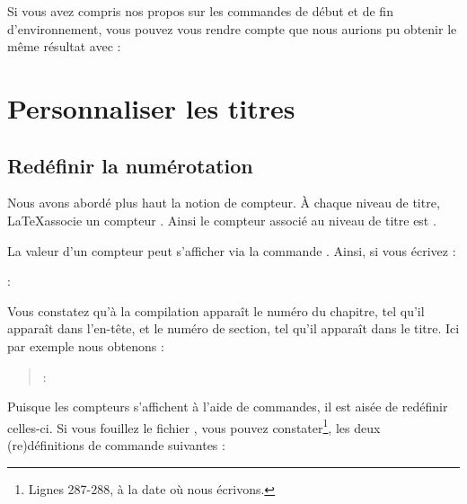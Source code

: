 \begin{plusloins}
Si vous avez compris nos propos sur les commandes de début et de fin d'environnement, vous pouvez vous rendre compte que nous aurions pu obtenir le même résultat avec :

\begin{latexcode}
\let\endoldquotation\endquotation
\renewcommand{\quotation}{\oldquotation\singlespace}
\end{latexcode}

\end{plusloins}

\section{Personnaliser les titres}

\subsection{Redéfinir la numérotation}\label{apparencecompteur}
Nous avons abordé plus haut la notion de compteur. À chaque niveau de titre, \LaTeX associe un compteur . Ainsi le compteur associé au niveau de titre  est .

La valeur d'un compteur peut s'afficher via la commande . Ainsi, si vous écrivez :

\begin{latexcode}
\thechapter : \thesection
\end{latexcode}

Vous constatez qu'à la compilation apparaît le numéro du chapitre, tel qu'il apparaît dans l'en-tête, et le numéro de section, tel qu'il apparaît dans le titre. Ici par exemple nous obtenons :


\begin{quotation}
\thechapter : \thesection
\end{quotation}


Puisque les compteurs s'affichent à l'aide de commandes, il est aisée de redéfinir celles-ci. Si vous fouillez le fichier , vous pouvez constater\footnote{Lignes 287-288, à la date où nous écrivons.}, les deux (re)définitions de commande suivantes :

\begin{latexcode}
\renewcommand \thechapter {\@arabic\c@chapter}
\renewcommand \thesection {\thechapter.\@arabic\c@section}
\end{latexcode}


